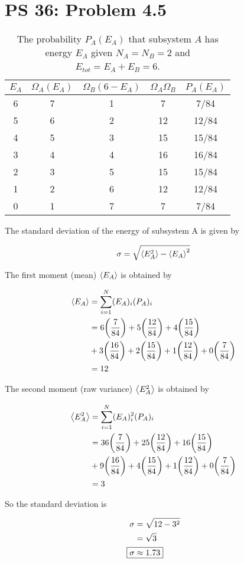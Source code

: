 \documentclass[12pt,a4paper,twocolumn]{article}
\begin{document}
\setcounter{page}{1}

\section*{PS 36: Problem 4.5}
\bigskip

\begin{table}[h!]
	\centering
	\begin{tabular}{|c|c||c|c|c|}
		\hline
		$E_A$ & $\Omega_A(E_A)$ & $\Omega_B(6-E_A)$ & $\Omega_A\Omega_B$ & $P_A(E_A)$ \\ \hline
		6 & 7 & 1 & 7 & 7/84 \\ \hline
		5 & 6 & 2 & 12 & 12/84 \\ \hline
		4 & 5 & 3 & 15 & 15/84 \\ \hline
		3 & 4 & 4 & 16 & 16/84 \\ \hline
		2 & 3 & 5 & 15 & 15/84 \\ \hline
		1 & 2 & 6 & 12 & 12/84 \\ \hline
		0 & 1 & 7 & 7 & 7/84 \\ \hline
	\end{tabular}
	\caption{The probability $P_A(E_A)$ that subsystem $A$ has energy $E_A$ given $N_A = N_B = 2$ and $E_{tot} = E_A + E_B = 6$.}
	\label{tab:given}
\end{table}

The standard deviation of the energy of subsystem A is given by

\begin{equation}
	\sigma = \sqrt{\ev{E_A^2} - \ev{E_A}^2} \label{eq:sd}
\end{equation}

The first moment (mean) $\ev{E_A}$ is obtained by

\begin{align}
	\ev{E_A} &= \sum_{i=1}^N (E_A)_i (P_A)_i \label{eq:mean} \\
	&= 6\qty(\frac{7}{84}) + 5\qty(\frac{12}{84}) + 4\qty(\frac{15}{84}) \nonumber \\
	&+ 3\qty(\frac{16}{84}) + 2\qty(\frac{15}{84}) + 1\qty(\frac{12}{84}) + 0\qty(\frac{7}{84}) \nonumber \\
	&= 12 \nonumber
\end{align}

The second moment (raw variance) $\ev{E_A^2}$ is obtained by

\begin{align}
	\ev{E_A^2} &= \sum_{i=1}^N (E_A)_i^2 (P_A)_i \label{eq:var} \\
	&= 36\qty(\frac{7}{84}) + 25\qty(\frac{12}{84}) + 16\qty(\frac{15}{84}) \nonumber \\
	&+ 9\qty(\frac{16}{84}) + 4\qty(\frac{15}{84}) + 1\qty(\frac{12}{84}) + 0\qty(\frac{7}{84}) \nonumber \\
	&= 3 \nonumber
\end{align}

So the standard deviation is

\begin{align}
	\sigma &= \sqrt{12 - 3^2} \nonumber \\
	&= \sqrt{3} \nonumber \\
	\Aboxed{
		\sigma &\approx 1.73
	}
\end{align}
\end{document}

